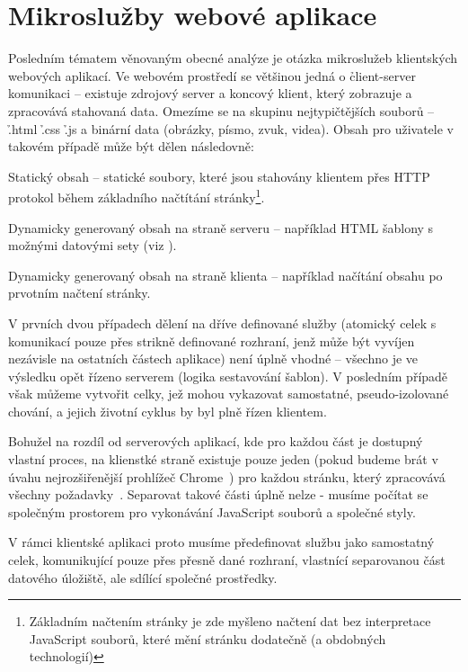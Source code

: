 
\section{Mikroslužby webové aplikace}\label{sec:msa-client}

Posledním tématem věnovaným obecné analýze  je otázka mikroslužeb klientských webových aplikací.
Ve webovém prostředí se většinou jedná o \h{client-server} komunikaci – existuje zdrojový server a koncový klient, který zobrazuje a zpracovává stahovaná data.
Omezíme se na skupinu nejtypičtějších souborů – \h{.html} \h{.css} \h{.js} a binární data (obrázky, písmo, zvuk, videa).
Obsah pro uživatele v takovém případě může být dělen následovně:

\begin{dl}
   \item[Statický obsah] – statické soubory, které jsou stahovány klientem přes HTTP protokol během základního načtítání stránky\footnote{Základním načtením stránky je zde myšleno načtení dat bez interpretace JavaScript souborů, které mění stránku dodatečně (a obdobných technologií)}.
   \item[Dynamicky generovaný obsah na straně serveru] – například HTML šablony s možnými datovými sety (viz ).
   \item[Dynamicky generovaný obsah na straně klienta] – například  načítání obsahu po prvotním načtení stránky.
\end{dl}

V prvních dvou případech dělení na dříve definované služby (atomický celek s komunikací pouze přes strikně definované rozhraní, jenž může být vyvíjen nezávisle na ostatních částech aplikace) není úplně vhodné – všechno je ve výsledku opět řízeno serverem (logika sestavování šablon).
V posledním případě však můžeme vytvořit celky, jež mohou vykazovat samostatné, pseudo-izolované chování, a jejich životní cyklus by byl plně řízen klientem.

Bohužel na rozdíl od serverových aplikací, kde pro každou část je dostupný vlastní proces, na klienstké straně existuje pouze jeden (pokud budeme brát v úvahu nejrozšiřenější prohlížeč Chrome~\cite{browserstats}) pro každou stránku, který zpracovává všechny požadavky~\cite{chromiumprocesses}.
Separovat takové části úplně nelze - musíme počítat se společným prostorem pro vykonávání JavaScript souborů a společné  styly.

V rámci klientské aplikaci proto musíme předefinovat službu jako samostatný celek, komunikující pouze přes přesně dané rozhraní, vlastnící separovanou část datového úložiště, ale sdílící společné prostředky.

